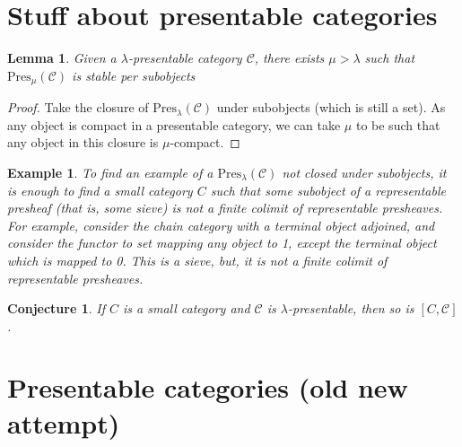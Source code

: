 \documentclass{article}
\newcommand{\Pres}[1]{\text{Pres}_{#1}}
\newtheorem{conjecture}[theorem]{Conjecture}
\newtheorem{example}[theorem]{Example}
\newtheorem{lemma}[theorem]{Lemma}
\begin{document}
  \section{Stuff about presentable categories}
  \begin{lemma}
    Given a $\lambda$-presentable category $\mathcal{C}$, there exists
    $\mu>\lambda$ such that $\Pres\mu(\mathcal{C})$ is stable per subobjects
  \end{lemma}
  \begin{proof}
   Take the closure of $\Pres\lambda(\mathcal{C})$ under subobjects (which is
   still a set). As any
   object is compact in a presentable category, we can take $\mu$ to be such
   that any object in this closure is $\mu$-compact.
  \end{proof}
  \begin{example}
    To find an example of a $\Pres\lambda(\mathcal{C})$ not closed under
    subobjects, it is enough to find a small category $C$ such that some
    subobject of a representable presheaf (that is, some sieve) is not a finite
    colimit of representable presheaves. For example, consider the chain
    category with a terminal object adjoined, and consider the functor to set
    mapping any object to 1, except the terminal object which is mapped to 0.
    This is a sieve, but, it is not a finite colimit of representable presheaves.
  \end{example}
  \begin{conjecture}
    If $C$ is a small category and $\mathcal{C}$ is $\lambda$-presentable, then
    so is $[C, \mathcal{C}]$.
  \end{conjecture}
   
\section{Presentable categories (old new attempt)}
\end{document}
